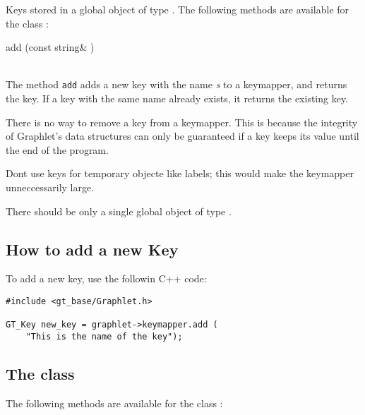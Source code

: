 \documentclass[twoside,fleqn]{report}
\begin{document}
Keys stored in a global object of type .  The
following methods are available for the class :

\begin{Cdefinition}

  \item[\GT{Key} add (const string\& \Param{s})] \strut \\
  The method \texttt{add} adds a new key with the name \emph{s}
  to a keymapper, and returns the key. If a key with the same
  name already exists, it returns the existing key.

\end{Cdefinition}

\begin{notes}
  \item There is no way to remove a key from a keymapper. This is
  because the integrity of Graphlet's data structures can only be
  guaranteed if a key keeps its value until the end of the
  program.
  
  \item Dont use keys for temporary objecte like labels; this
  would make the keymapper unneccessarily large.
  
  \item There should be only a single global object of type
  .
\end{notes}




%
%

\subsection{How to add a new Key}
\label{s:HowToAddANewKey}

To add a new key, use the followin C++ code:

\begin{verbatim}
#include <gt_base/Graphlet.h>

GT_Key new_key = graphlet->keymapper.add (
    "This is the name of the key");
\end{verbatim}


%
%

\subsection{The class }

The following methods are available for the class :
\end{document}
